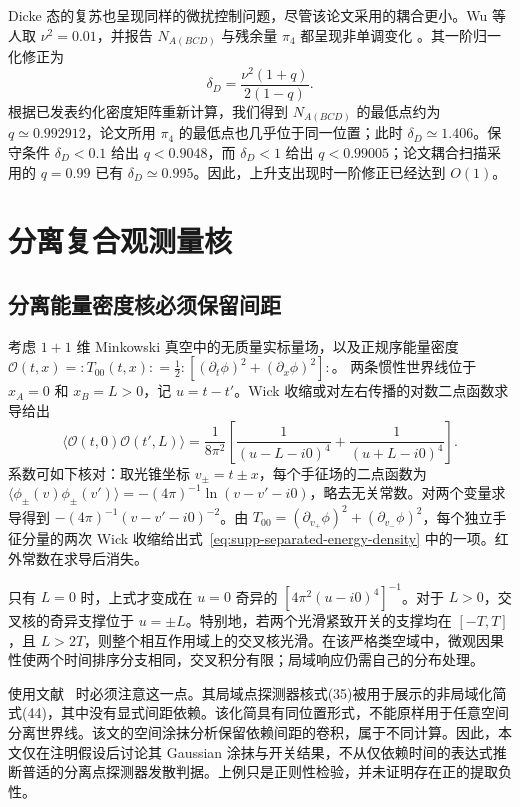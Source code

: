 \documentclass[UTF8,11pt,a4paper,fontset=none]{ctexart}
\begin{document}
Dicke 态的复苏也呈现同样的微扰控制问题，尽管该论文采用的耦合更小。Wu 等人取 $\nu^2=0.01$，并报告 $N_{A(BCD)}$ 与残余量 $\pi_4$ 都呈现非单调变化 \cite{WuDicke2026}。其一阶归一化修正为
\begin{equation}
\delta_D=\frac{\nu^2(1+q)}{2(1-q)}.
\label{eq:dicke-control}
\end{equation}
根据已发表约化密度矩阵重新计算，我们得到 $N_{A(BCD)}$ 的最低点约为 $q\simeq0.992912$，论文所用 $\pi_4$ 的最低点也几乎位于同一位置；此时 $\delta_D\simeq1.406$。保守条件 $\delta_D<0.1$ 给出 $q<0.9048$，而 $\delta_D<1$ 给出 $q<0.99005$；论文耦合扫描采用的 $q=0.99$ 已有 $\delta_D\simeq0.995$。因此，上升支出现时一阶修正已经达到 $O(1)$。



\section{分离复合观测量核}
\label{app:composite-kernel}
\subsection{分离能量密度核必须保留间距}
考虑 $1+1$ 维 Minkowski 真空中的无质量实标量场，以及正规序能量密度
$\mathcal O(t,x)=:\!T_{00}(t,x)\!:
=\tfrac12:\![(\partial_t\phi)^2+(\partial_x\phi)^2]\!:$。
两条惯性世界线位于 $x_A=0$ 和 $x_B=L>0$，记 $u=t-t'$。Wick 收缩或对左右传播的对数二点函数求导给出
\begin{equation}
\langle\mathcal O(t,0)\mathcal O(t',L)\rangle
=\frac{1}{8\pi^2}\left[
\frac{1}{(u-L-i0)^4}+\frac{1}{(u+L-i0)^4}\right].
\label{eq:supp-separated-energy-density}
\end{equation}
系数可如下核对：取光锥坐标 $v_\pm=t\pm x$，每个手征场的二点函数为
$\langle\phi_\pm(v)\phi_\pm(v')\rangle=-(4\pi)^{-1}\ln(v-v'-i0)$，略去无关常数。对两个变量求导得到 $-(4\pi)^{-1}(v-v'-i0)^{-2}$。由
$T_{00}=(\partial_{v_+}\phi)^2+(\partial_{v_-}\phi)^2$，每个独立手征分量的两次 Wick 收缩给出式~\eqref{eq:supp-separated-energy-density} 中的一项。红外常数在求导后消失。

只有 $L=0$ 时，上式才变成在 $u=0$ 奇异的 $[4\pi^2(u-i0)^4]^{-1}$。对于 $L>0$，交叉核的奇异支撑位于 $u=\pm L$。特别地，若两个光滑紧致开关的支撑均在 $[-T,T]$，且 $L>2T$，则整个相互作用域上的交叉核光滑。在该严格类空域中，微观因果性使两个时间排序分支相同，交叉积分有限；局域响应仍需自己的分布处理。

使用文献~\cite{ZambiancoRagulaMartinez2026UV} 时必须注意这一点。其局域点探测器核式(35)被用于展示的非局域化简式(44)，其中没有显式间距依赖。该化简具有同位置形式，不能原样用于任意空间分离世界线。该文的空间涂抹分析保留依赖间距的卷积，属于不同计算。因此，本文仅在注明假设后讨论其 Gaussian 涂抹与开关结果，不从仅依赖时间的表达式推断普适的分离点探测器发散判据。上例只是正则性检验，并未证明存在正的提取负性。
\end{document}
